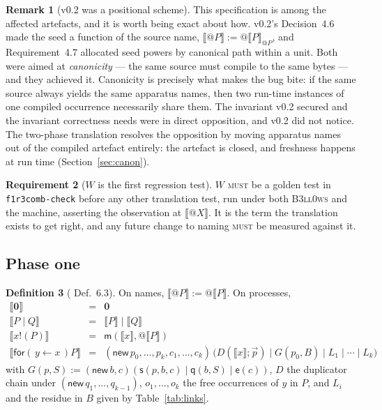 \documentclass[11pt,a4paper]{article}
\makeatletter
\newcommand{\code}[1]{\texttt{#1}}
\newcommand{\Bell}{\textsc{B3ll0ws}}
\newcommand{\MUST}{\textsc{must}}
\newcommand{\quo}[1]{@#1}
\newcommand{\inp}[3]{\mathsf{for}(\,#1 \leftarrow #2\,)#3}
\newcommand{\out}[2]{#1!(#2)}
\newcommand{\nil}{\mathbf{0}}
\newcommand{\enc}[1]{\llbracket #1 \rrbracket}
\newcommand{\mm}{\mathsf{m}}
\newcommand{\sy}{\mathsf{s}}
\newcommand{\ev}{\mathsf{e}}
\newcommand{\qq}{\mathsf{q}}
\theoremstyle{definition}
\newtheorem{definition}{Definition}[section]
\newtheorem{requirement}[definition]{Requirement}
\newtheorem{remark}[definition]{Remark}
\theoremstyle{plain}
\makeatother
\begin{document}
\begin{remark}[v0.2 was a positional scheme]\label{rem:v2bug}
This specification is among the affected artefacts, and it is worth being
exact about how. v0.2's Decision~4.6 made the seed a function of the source
name, $\enc{\quo{P}} := \quo{\enc{P}_{\quo{P}}}$, and Requirement~4.7
allocated seed powers by canonical path within a unit. Both were aimed at
\emph{canonicity} --- the same source must compile to the same bytes --- and
they achieved it. Canonicity is precisely what makes the bug bite: if the same
source always yields the same apparatus names, then two run-time instances of
one compiled occurrence necessarily share them. The invariant v0.2 secured and
the invariant correctness needs were in direct opposition, and v0.2 did not
notice. The two-phase translation resolves the opposition by moving apparatus
names out of the compiled artefact entirely: the artefact is closed, and
freshness happens at run time (Section~\ref{sec:canon}).
\end{remark}

\begin{requirement}[$W$ is the first regression test]\label{req:Wtest}
$W$ \MUST{} be a golden test in \code{f1r3comb-check} before any other
translation test, run under both \Bell{} and the machine, asserting the
observation at $\enc{\quo{X}}$. It is the term the translation exists to get
right, and any future change to naming \MUST{} be measured against it.
\end{requirement}

\subsection{Phase one}\label{sec:ir}

\begin{definition}[\cite{draft3} Def.~6.3]\label{def:phase1}
On names, $\enc{\quo{P}} := \quo{\enc{P}}$. On processes,
\[
\begin{array}{rcl}
  \enc{\nil} &=& \nil\\
  \enc{P \mid Q} &=& \enc{P} \mid \enc{Q}\\
  \enc{\out{x}{P}} &=& \mm(\enc{x}, \quo{\enc{P}})\\
  \enc{\inp{y}{x}{P}} &=& (\mathsf{new}\,p_{0},\dots,p_{k},c_{1},\dots,c_{k})\,
    \big(D(\enc{x};\vec p) \mid G(p_{0}, B) \mid L_{1} \mid \cdots \mid L_{k}\big)
\end{array}
\]
with $G(p,S) := (\mathsf{new}\,b,c)(\sy(p,b,c) \mid \qq(b,S) \mid \ev(c))$,
$D$ the duplicator chain under $(\mathsf{new}\,q_{1},\dots,q_{k-1})$,
$o_{1},\dots,o_{k}$ the free occurrences of $y$ in $P$, and $L_{i}$ and the
residue in $B$ given by Table~\ref{tab:links}.
\end{definition}
\end{document}
